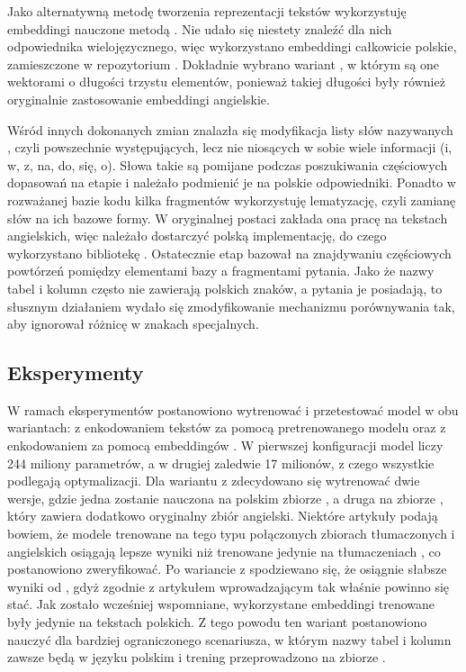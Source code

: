 Jako alternatywną metodę tworzenia reprezentacji tekstów  wykorzystuję embeddingi nauczone metodą . Nie udało się niestety znaleźć dla nich odpowiednika wielojęzycznego, więc wykorzystano embeddingi całkowicie polskie, zamieszczone w repozytorium  . Dokładnie wybrano wariant , w którym są one wektorami o długości trzystu elementów, ponieważ takiej długości były również oryginalnie zastosowanie embeddingi angielskie.

Wśród innych dokonanych zmian znalazła się modyfikacja listy słów nazywanych , czyli powszechnie występujących, lecz nie niosących w sobie wiele informacji (i, w, z, na, do, się, o). Słowa takie są pomijane podczas poszukiwania częściowych dopasowań na etapie  i należało podmienić je na polskie odpowiedniki. Ponadto w rozważanej bazie kodu kilka fragmentów wykorzystuję lematyzację, czyli zamianę słów na ich bazowe formy. W oryginalnej postaci zakłada ona pracę na tekstach angielskich, więc należało dostarczyć polską implementację, do czego wykorzystano bibliotekę . Ostatecznie etap  bazował na znajdywaniu częściowych powtórzeń pomiędzy elementami bazy a fragmentami pytania. Jako że nazwy tabel i kolumn często nie zawierają polskich znaków, a pytania je posiadają, to słusznym działaniem wydało się zmodyfikowanie mechanizmu porównywania tak, aby ignorował różnicę w znakach specjalnych.

\subsection{Eksperymenty}

W ramach eksperymentów postanowiono wytrenować i przetestować model  w obu wariantach: z enkodowaniem tekstów za pomocą pretrenowanego modelu  oraz z enkodowaniem za pomocą embeddingów . W pierwszej konfiguracji model liczy 244 miliony parametrów, a w drugiej zaledwie 17 milionów, z czego wszystkie podlegają optymalizacji. Dla wariantu z  zdecydowano się wytrenować dwie wersje, gdzie jedna zostanie nauczona na polskim zbiorze , a druga na zbiorze , który zawiera dodatkowo oryginalny zbiór angielski. Niektóre artykuły podają bowiem, że modele trenowane na tego typu połączonych zbiorach tłumaczonych i angielskich osiągają lepsze wyniki niż trenowane jedynie na tłumaczeniach , co postanowiono zweryfikować. Po wariancie z  spodziewano się, że osiągnie słabsze wyniki od , gdyż zgodnie z artykułem wprowadzającym  tak właśnie powinno się stać. Jak zostało wcześniej wspomniane, wykorzystane embeddingi  trenowane były jedynie na tekstach polskich. Z tego powodu ten wariant postanowiono nauczyć dla bardziej ograniczonego scenariusza, w którym nazwy tabel i kolumn zawsze będą w języku polskim i trening przeprowadzono na zbiorze .

